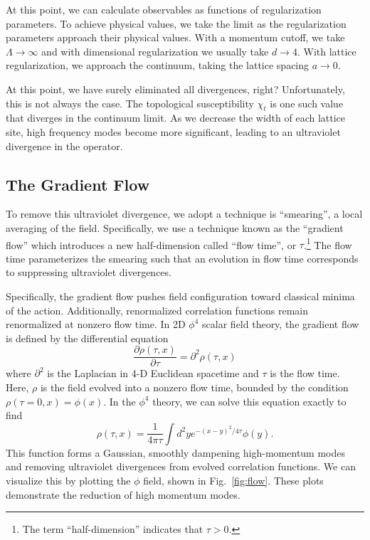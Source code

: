 \documentclass[12pt]{report}
\begin{document}
At this point, we can calculate observables as functions of regularization parameters. To achieve physical values, we take the limit as the regularization parameters approach their physical values. With a momentum cutoff, we take $\Lambda \rightarrow \infty$ and with dimensional regularization we usually take $d\rightarrow 4$. With lattice regularization, we approach the continuum, taking the lattice spacing $a\rightarrow 0$. 

At this point, we have surely eliminated all divergences, right? Unfortunately, this is not always the case. The topological susceptibility $\chi_t$ is one such value that diverges in the continuum limit. As we decrease the width of each lattice site, high frequency modes become more significant, leading to an ultraviolet divergence in the operator. 

\subsection{The Gradient Flow}
\label{sec:gradflow}
To remove this ultraviolet divergence, we adopt a technique is ``smearing'', a local averaging of the field.\cite{solbrig2007} Specifically, we use a technique known as the ``gradient flow'' \cite{monahan2015} which introduces a new half-dimension called ``flow time'', or $\tau$.\footnote{The term ``half-dimension'' indicates that $\tau>0$.}  The flow time parameterizes the smearing such that an evolution in flow time corresponds to suppressing ultraviolet divergences. 

Specifically, the gradient flow pushes field configuration toward classical minima of the action. Additionally, renormalized correlation functions remain renormalized at nonzero flow time.\cite{luscher2013} In 2D $\phi^4$ scalar field theory, the gradient flow is defined by the differential equation 
\begin{equation}
    \frac{\partial \rho(\tau, x)}{\partial \tau} = \partial^2 \rho(\tau,x)
\end{equation}
where $\partial^2$ is the Laplacian in 4-D Euclidean spacetime and $\tau$ is the flow time. Here, $\rho$ is the field evolved into a nonzero flow time, bounded by the condition $\rho(\tau=0,x) = \phi(x)$. In the $\phi^4$ theory, we can solve this equation exactly to find \cite{monahan2016}
\begin{equation}
    \rho(\tau, x) = \frac{1}{4 \pi \tau} \int d^2 y e^{-(x-y)^2/4\tau} \phi(y).
\end{equation}
This function forms a Gaussian, smoothly dampening high-momentum modes and removing ultraviolet divergences from evolved correlation functions.\cite{makino2015a} We can visualize this by plotting the $\phi$ field, shown in Fig.~\ref{fig:flow}. These plots demonstrate the reduction of high momentum modes.
\end{document}
